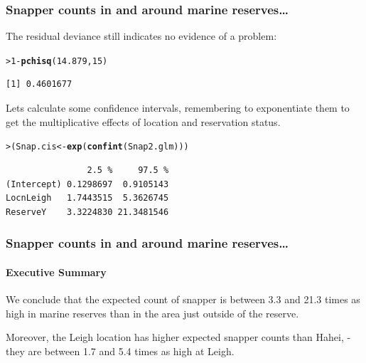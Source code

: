 \documentclass{beamer}\usepackage[]{graphicx}\usepackage[]{xcolor}
\makeatletter
\newcommand{\hlnum}[1]{\textcolor[rgb]{0.686,0.059,0.569}{#1}}%
\newcommand{\hlopt}[1]{\textcolor[rgb]{0,0,0}{#1}}%
\newcommand{\hlstd}[1]{\textcolor[rgb]{0.345,0.345,0.345}{#1}}%
\newcommand{\hlkwb}[1]{\textcolor[rgb]{0.69,0.353,0.396}{#1}}%
\newcommand{\hlkwd}[1]{\textcolor[rgb]{0.737,0.353,0.396}{\textbf{#1}}}%
\newenvironment{kframe}{%
 \def\at@end@of@kframe{}%
 \ifinner\ifhmode%
  \def\at@end@of@kframe{\end{minipage}}%
  \begin{minipage}{\columnwidth}%
 \fi\fi%
 \def\FrameCommand##1{\hskip\@totalleftmargin \hskip-\fboxsep
 \colorbox{shadecolor}{##1}\hskip-\fboxsep
     \hskip-\linewidth \hskip-\@totalleftmargin \hskip\columnwidth}%
 \MakeFramed {\advance\hsize-\width
   \@totalleftmargin\z@ \linewidth\hsize
   \@setminipage}}%
 {\par\unskip\endMakeFramed%
 \at@end@of@kframe}
\newenvironment{knitrout}{}{} %
\makeatother
\begin{document}
\begin{frame}[fragile]
\frametitle{Snapper counts in and around marine reserves\ldots}
The residual deviance still indicates no evidence of a problem:
\begin{knitrout}\scriptsize
{}\color{fgcolor}\begin{kframe}
\begin{alltt}
\hlstd{> }\hlnum{1} \hlopt{-} \hlkwd{pchisq}\hlstd{(}\hlnum{14.879}\hlstd{,} \hlnum{15}\hlstd{)}
\end{alltt}
\begin{verbatim}
[1] 0.4601677
\end{verbatim}
\end{kframe}
\end{knitrout}
\bigskip

Lets calculate some confidence intervals, 
remembering to exponentiate them to get the multiplicative effects of
location and reservation status.

\begin{knitrout}\scriptsize
{}\color{fgcolor}\begin{kframe}
\begin{alltt}
\hlstd{> }\hlstd{(Snap.cis} \hlkwb{<-} \hlkwd{exp}\hlstd{(}\hlkwd{confint}\hlstd{(Snap2.glm)))}
\end{alltt}


{\ttfamily\noindent\itshape\color{messagecolor}{Waiting for profiling to be done...}}\begin{verbatim}
                2.5 %     97.5 %
(Intercept) 0.1298697  0.9105143
LocnLeigh   1.7443515  5.3626745
ReserveY    3.3224830 21.3481546
\end{verbatim}
\end{kframe}
\end{knitrout}

\end{frame}

\begin{frame}[fragile]
\frametitle{Snapper counts in and around marine reserves\ldots}
\framesubtitle{Executive Summary}
We conclude that the expected count of snapper is between 3.3 and 21.3 times as high in marine reserves than in the area just outside of the reserve.
\bigskip

Moreover, the Leigh location has higher expected snapper counts than Hahei,
 - they are between 1.7 and 5.4 times as high at Leigh.
\end{frame}
\end{document}
